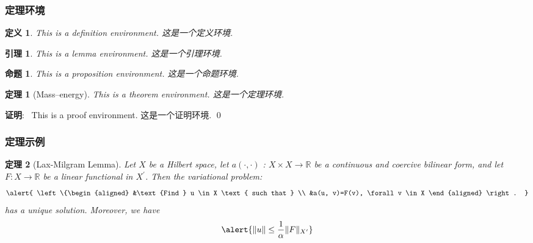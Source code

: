 \documentclass[notheorems,11pt]{beamer}
\theoremstyle{plain}
\newtheorem{theorem}{定理}
\numberwithin{theorem}{section}
\newtheorem{definition}{定义}
\numberwithin{definition}{section}
\newtheorem{lemma}{引理}
\numberwithin{lemma}{section}
\newtheorem{proposition}{命题}
\numberwithin{proposition}{section}
\numberwithin{corollary}{section}
\theoremstyle{example}
\renewenvironment{proof}[1][证明]{\textbf{#1}:~}{\qed\par}
\numberwithin{figure}{section}
\numberwithin{table}{section}
\numberwithin{equation}{section}
\begin{document}
\begin{frame}
\frametitle{定理环境}
\begin{definition} \upshape\rmfamily
This is a definition environment. 这是一个定义环境.
\end{definition}


\begin{lemma} \upshape\rmfamily
This is a lemma environment. 这是一个引理环境.
\end{lemma}

\begin{proposition} \upshape\rmfamily
This is a proposition environment. 这是一个命题环境.
\end{proposition}

\begin{theorem}[Mass--energy] \upshape\rmfamily
This is a theorem environment. 这是一个定理环境.
\end{theorem}

\begin{proof}
  This is a proof environment. 这是一个证明环境.
\end{proof}

\end{frame}



\begin{frame}
\frametitle{定理示例}

\begin{theorem}[Lax-Milgram Lemma] \upshape
Let $X$ be a Hilbert space, let $a(\cdot, \cdot)$ : $X \times X \rightarrow \mathbb{R}$ be a continuous and coercive bilinear form, and let $F : X \rightarrow \mathbb{R}$ be a linear functional in $X^{\prime}$. Then the variational problem:
\begin{equation}
  \alert{
  \left\{\begin{aligned}
  &\text {Find } u \in X \text { such that } \\
  &a(u, v)=F(v), \forall v \in X
  \end{aligned} \right. }
\end{equation}
has a unique solution. Moreover, we have
\begin{equation}
  \alert{ \|u\| \leq \frac{1}{\alpha}\|F\|_{X^{\prime}}  }
\end{equation}
\end{theorem}

\end{frame}

\end{document}
